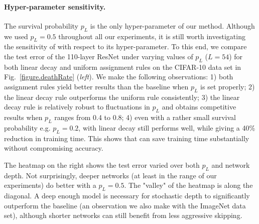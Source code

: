 \paragraph{\textbf{Hyper-parameter sensitivity.}}
The survival probability $p_L$ is the only hyper-parameter of our method. Although we used $p_L\!=\!0.5$ throughout all our experiments, it is still worth investigating the sensitivity of \name{} with respect to its hyper-parameter. To this end, we compare the test error of the 110-layer ResNet under varying values of $p_L$ ($L=54$) for both linear decay and uniform assignment rules on the CIFAR-10 data set in Fig.~\ref{figure.deathRate} (\textit{left}). We make the following observations: 1) both assignment rules yield better results than the baseline when $p_L$ is set properly; 2) the linear decay rule outperforms the uniform rule consistently; 3) the linear decay rule is relatively robust to fluctuations in $p_L$ and obtains competitive results when $p_L$ ranges from 0.4 to 0.8; 4) even with a rather small survival probability e.g. $p_L=0.2$, \name{} with linear decay still performs well, while giving a 40\% reduction in training time. This shows that \name{} can save training time substantially without compromising accuracy.

The heatmap on the right shows the test error varied over both $p_L$ and network depth. Not surprisingly, deeper networks (at least in the range of our experiments) do better with a $p_L=0.5$. The "valley" of the heatmap is along the diagonal. A deep enough model is necessary for stochastic depth to significantly outperform the baseline (an observation we also make with the ImageNet data set), although shorter networks can still benefit from less aggressive skipping.
